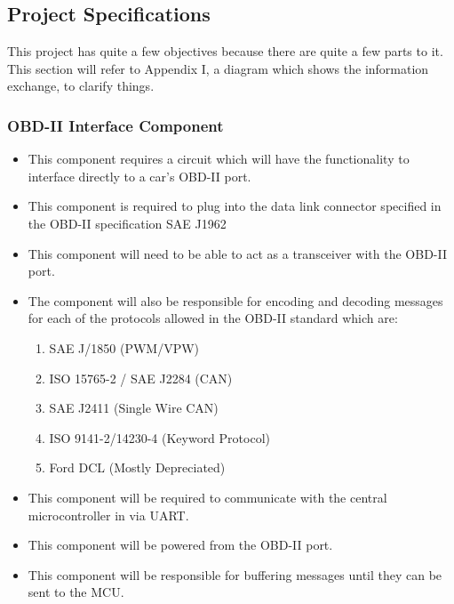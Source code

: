 \documentclass[12pt,letterpaper]{article}
\begin{document}
\subsection{Project Specifications}
This project has quite a few objectives because there are quite a few parts to it. This section will refer to Appendix I, a diagram which shows the information exchange, to clarify things.

\subsubsection{OBD-II Interface Component}
\begin{itemize}
	\item This component requires a circuit which will have the functionality to interface directly to a car's OBD-II port. 
	\item This component is required to plug into the data link connector specified in the OBD-II specification SAE J1962
	\item This component will need to be able to act as a transceiver with the OBD-II port.
	\item The component will also be responsible for encoding and decoding messages for each of the protocols allowed in the OBD-II standard which are:
	\begin{enumerate}
		\item SAE J/1850 (PWM/VPW)
		\item ISO 15765-2 / SAE J2284 (CAN)
		\item SAE J2411 (Single Wire CAN)
		\item ISO 9141-2/14230-4 (Keyword Protocol)
		\item Ford DCL (Mostly Depreciated) 
	\end{enumerate}
	\item This component will be required to communicate with the central microcontroller in via UART.
	\item This component will be powered from the OBD-II port.
	\item This component will be responsible for buffering messages until they can be sent to the MCU.
\end{itemize}
\end{document}

